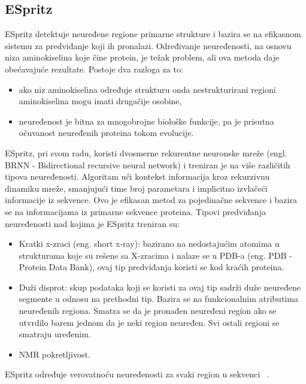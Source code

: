 \subsection{ESpritz}
ESpritz detektuje neuređene regione primarne strukture i bazira se na efikasnom sistemu za predviđanje koji ih pronalazi. Određivanje neuređenosti, na osnovu niza aminokiselina koje čine protein, je težak problem, ali ova metoda daje obećavajuće rezultate. Postoje dva razloga za to:
\begin{itemize}
\item  ako niz aminokiselina određuje strukturu onda nestrukturirani regioni aminokiselina mogu imati drugačije osobine, 
\item neuređenost je bitna za mnogobrojne biološke funkcije, pa je prisutna očuvanost neuređenih proteina tokom evolucije. 
\end{itemize}

ESpritz, pri svom radu, koristi dvosmerne rekurentne neuronske mreže (engl. BRNN - Bidirectional recursive neural network) i treniran je na više različitih tipova neuređenosti. Algoritam uči kontekst informacija kroz rekurzivnu dinamiku mreže, smanjujući time broj parametara i implicitno izvlačeći informacije iz sekvence. Ovo je efikasan metod za pojedinačne sekvence i bazira se na informacijama iz primarne sekvence proteina. Tipovi predviđanja neuređenosti nad kojima je ESpritz treniran su:
\begin{itemize}
\item Kratki x-zraci (eng. short x-ray): bazirano na nedostajućim atomima u strukturama koje su rešene sa X-zracima i nalaze se u PDB-a (eng. PDB - Protein Data Bank), ovaj tip predviđanja koristi se kod kraćih proteina. 
\item Duži disprot: skup podataka koji se koristi za ovaj tip sadrži duže neuređene segmente u odnosu na prethodni tip. Bazira se na funkcionalnim atributima neuređenih regiona. Smatra se da je pronađen neuređeni region ako se utvrdilo barem jednom da je neki region neuređen. Svi ostali regioni se smatraju uređenim.
\item NMR pokretljivost.
\end{itemize}
ESpritz određuje verovatnoću neuređenosti za svaki region u sekvenci ~\cite{ESpritzAFPD, ESpritzEP, ESpritz2, ESpritz3}.



